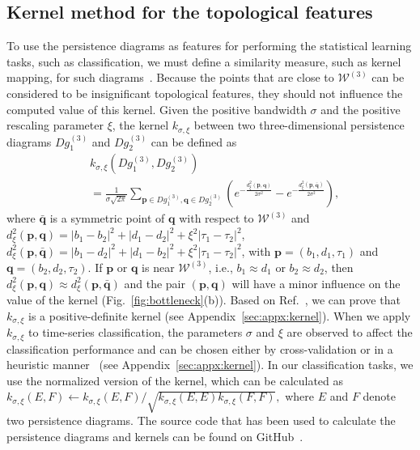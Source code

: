 \documentclass[twocolumn,pre,amsmath,amssymb]{revtex4-1}
\newcommand{\bp}{\ensuremath{\boldsymbol{p}}}
\newcommand{\bq}{\ensuremath{\boldsymbol{q}}}
\newcommand{\bbq}{\ensuremath{\boldsymbol{\bar{q}}}}
\begin{document}
\subsection{Kernel method for the topological features}
To use the persistence diagrams as features for performing the statistical learning tasks, such as classification, 
we must define a similarity measure, such as kernel mapping, 
for such diagrams~\cite{reininghaus:mskernel:2015, kusano:gskernel:2016, carrire:wskernel:2017}. 
Because the points that are close to $\mathcal{W}^{(3)}$ can be considered to be insignificant topological features,
they should not influence the computed value of this kernel. 
Given the positive bandwidth $\sigma$ and the positive rescaling parameter $\xi$, 
the kernel $k_{\sigma, \xi}$ between two three-dimensional persistence diagrams $Dg^{(3)}_1$ and $Dg^{(3)}_2$ can be defined as
\begin{align}\label{eqn:kernel:def}
&k_{\sigma, \xi}(Dg^{(3)}_1, Dg^{(3)}_2)\nonumber\\
&=\frac{1}{\sigma\sqrt{2\pi}}\sum_{\bp\in Dg^{(3)}_1, \bq \in Dg^{(3)}_2} \left( e^{-\frac{d_{\xi}^2(\bp, \bq)}{2\sigma^2}} - e^{-\frac{d_{\xi}^2(\bp, \bbq)}{2\sigma^2}} \right),
\end{align}
where $\bbq$ is a symmetric point of $\bq$ with respect to $\mathcal{W}^{(3)}$ and $d^2_{\xi}(\bp, \bq)=|b_1-b_2|^2+|d_1-d_2|^2+\xi^2|\tau_1-\tau_2|^2$,  $d^2_{\xi}(\bp, \bbq)=|b_1-d_2|^2+|d_1-b_2|^2+\xi^2|\tau_1-\tau_2|^2$, with $\bp=\left(b_1,d_1,\tau_1\right)$ and $\bq=\left(b_2,d_2,\tau_2\right)$.
If $\bp$ or $\bq$ is near $\mathcal{W}^{(3)}$, i.e., $b_1 \approx d_1$ or $b_2 \approx d_2$, then $d^2_{\xi}(\bp, \bq) \approx d^2_{\xi}(\bp, \bbq)$ and the pair $(\bp, \bq)$ will have a minor influence on
the value of the kernel (Fig.~\ref{fig:bottleneck}(b)).
Based on Ref.~\cite{reininghaus:mskernel:2015}, we can prove that $k_{\sigma,\xi}$ is a positive-definite kernel (see Appendix~\ref{sec:appx:kernel}).
When we apply $k_{\sigma, \xi}$ to time-series classification, 
the parameters $\sigma$ and $\xi$ are observed to affect the classification performance 
and can be chosen either by cross-validation or in a heuristic manner~\cite{gretton:nips:2007} (see Appendix~\ref{sec:appx:kernel}).
In our classification tasks, we use the normalized version of the kernel, which can be calculated as
$
k_{\sigma, \xi}(E, F) \leftarrow k_{\sigma, \xi}(E, F) / \sqrt{k_{\sigma, \xi}(E, E)k_{\sigma, \xi}(F, F)},
$
where $E$ and $F$ denote two persistence diagrams.
The source code that has been used to calculate the persistence diagrams and kernels can be found on GitHub~\cite{gitsource}.
\end{document}
